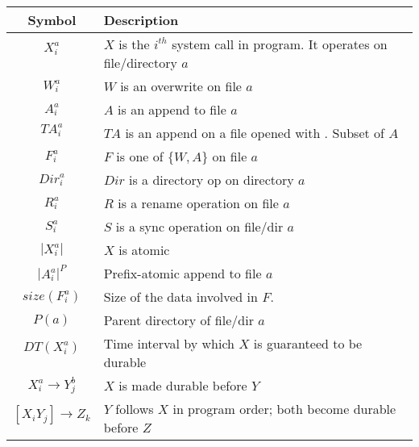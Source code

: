 \begin{table}[!t]
\begin{center}
{\footnotesize
\begin{tabular}{c|l}
\textbf{Symbol} & \textbf{Description} \\
\hline
$X^{a}_{i}$ & \multirow{2}{*}{\parbox{5cm}{$X$ is the $i^{th}$ system call in
program. It operates on file/directory $a$}} \\
 & \\
\hline
$W^{a}_{i}$ & $W$ is an overwrite on file $a$ \\
\hline
$A^{a}_{i}$ & $A$ is an append to file $a$ \\
\hline
${TA}^{a}_{i}$ & \multirow{2}{*}{\parbox{5cm}{$TA$ is an append on a file
opened with . Subset of $A$}} \\
 & \\
\hline
$F^{a}_{i}$ & $F$ is one of $\{W, A\}$ on file $a$ \\
\hline
${Dir}^{a}_{i}$ & $Dir$ is a directory op on directory $a$ \\
\hline
$R^{a}_{i}$ & $R$ is a rename operation on file $a$ \\ 
\hline
$S^{a}_{i}$ & $S$ is a sync operation on file/dir $a$ \\ 
\hline
$|X^{a}_{i}|$ & $X$ is atomic \\
\hline
$|A^{a}_{i}|^{P}$ & Prefix-atomic append to file $a$ \\
\hline
$size(F^{a}_{i})$ & Size of the data involved in $F$. \\
\hline
$P(a)$ & Parent directory of file/dir $a$ \\ 
\hline
$DT(X^{a}_{i})$ & \multirow{2}{*}{\parbox{5cm}{Time interval by which $X$ is guaranteed
to be durable}} \\
 & \\
\hline
$X^{a}_{i} \to Y^{b}_{j}$ & $X$ is made durable before $Y$ \\ 
\hline
$[X_i Y_j] \to Z_k$ & \multirow{2}{*}{\parbox{5cm}{$Y$ follows $X$ in program order; both become
durable before $Z$}}. \\ 
& \\
\end{tabular}
}
\end{center}
\vspace{-0.2in}
\vspace{-0.1in}
\end{table}

